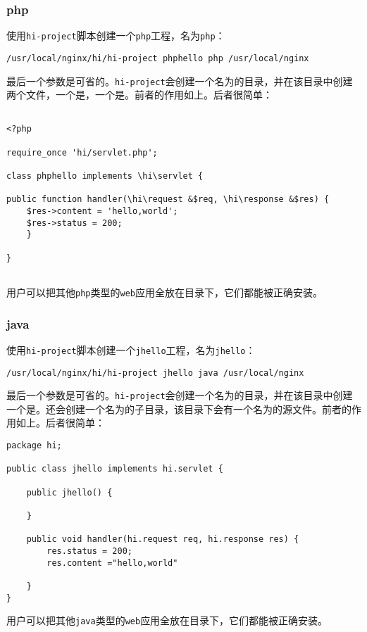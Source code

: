 \subsubsection{php}
使用\texttt{hi-project}脚本创建一个\texttt{php}工程，名为\texttt{php}：
\begin{lstlisting}
/usr/local/nginx/hi/hi-project phphello php /usr/local/nginx
\end{lstlisting}
最后一个参数是可省的。\texttt{hi-project}会创建一个名为的目录，并在该目录中创建两个文件，一个是，一个是。前者的作用如上。后者很简单：
\begin{lstlisting}

<?php

require_once 'hi/servlet.php';

class phphello implements \hi\servlet {

public function handler(\hi\request &$req, \hi\response &$res) {
	$res->content = 'hello,world';
	$res->status = 200;
	}

}


\end{lstlisting}
用户可以把其他\texttt{php}类型的\texttt{web}应用全放在目录下，它们都能被正确安装。


\subsubsection{java}
使用\texttt{hi-project}脚本创建一个\texttt{jhello}工程，名为\texttt{jhello}：
\begin{lstlisting}
/usr/local/nginx/hi/hi-project jhello java /usr/local/nginx
\end{lstlisting}
最后一个参数是可省的。\texttt{hi-project}会创建一个名为的目录，并在该目录中创建一个是。还会创建一个名为的子目录，该目录下会有一个名为的源文件。前者的作用如上。后者很简单：
\begin{lstlisting}
package hi;

public class jhello implements hi.servlet {

    public jhello() {

    }

    public void handler(hi.request req, hi.response res) {
        res.status = 200;
        res.content ="hello,world"

    }
}
\end{lstlisting}
用户可以把其他\texttt{java}类型的\texttt{web}应用全放在目录下，它们都能被正确安装。

